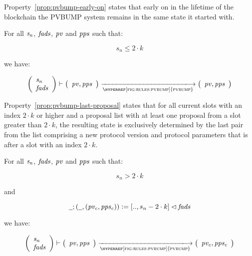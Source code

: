Property~\ref{prop:pvbump-early-on} states that early on in the lifetime
of the blockchain the PVBUMP system remains in the same state it started with.

\begin{property}\label{prop:pvbump-early-on}
  For all $\mathit{s_n}$, $\mathit{fads}$, $\mathit{pv}$ and $\mathit{pps}$ such that:

  $$s_n \leq 2 \cdot k$$

  we have:

  $$
  \left(
    \begin{array}{l}
      \var{s_n}\\
      \var{fads}
    \end{array}
  \right)
  \vdash
  \left(
    \begin{array}{l}
      \var{pv}, \var{pps}\\
    \end{array}
  \right)
  \trans{\hyperref[fig:rules:pvbump]{pvbump}}{}
  \left(
    \begin{array}{l}
      \var{pv}, \var{pps}\\
    \end{array}
  \right)
  $$
\end{property}

Property~\ref{prop:pvbump-last-proposal} states that for all current slots
with an index $2 \cdot k$ or higher and a proposal list with at least one
proposal from a slot greater than $2 \cdot k$, the resulting state is
exclusively determined by the last pair from the list comprising a new
protocol version and protocol parameters that is after a slot with an index
$2 \cdot k$.

\begin{property}\label{prop:pvbump-last-proposal}
  For all $\mathit{s_n}$, $\mathit{fads}$, $\mathit{pv}$ and $\mathit{pps}$ such that:

  $$s_n > 2 \cdot k$$

  and

  $$
  \wcard ; (\wcard , (\var{pv_c}, \var{pps_c})) \leteq [.., s_n - 2 \cdot k]
  \restrictdom \var{fads}
  $$

  we have:

  $$
  \left(
    \begin{array}{l}
      \var{s_n}\\
      \var{fads}
    \end{array}
  \right)
  \vdash
  \left(
    \begin{array}{l}
      \var{pv}, \var{pps}\\
    \end{array}
  \right)
  \trans{\hyperref[fig:rules:pvbump]{pvbump}}{}
  \left(
    \begin{array}{l}
      \var{pv_c}, \var{pps_c}\\
    \end{array}
  \right)
  $$
\end{property}